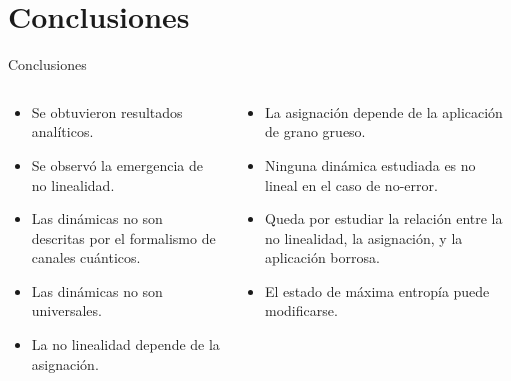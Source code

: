 \section{Conclusiones}

\begin{frame}{Conclusiones}
    \begin{columns}
        \begin{column}{0.5\textwidth}
            \begin{itemize}
                \item Se obtuvieron resultados analíticos.\pause
                \item Se observó la emergencia de no linealidad.\pause
                \item Las dinámicas no son descritas por el formalismo de canales cuánticos.\pause
                \item Las dinámicas no son universales.\pause
                \item La no linealidad depende de la asignación.\pause
            \end{itemize}
        \end{column}
        \begin{column}{0.5\textwidth}
            \begin{itemize}
                \item La asignación depende de la aplicación de grano grueso.\pause
                \item Ninguna dinámica estudiada es no lineal en el caso de no-error.\pause
                \item Queda por estudiar la relación entre la no linealidad, la asignación, y la aplicación borrosa.\pause
                \item El estado de máxima entropía puede modificarse.\pause
            \end{itemize}
        \end{column}
    \end{columns}
\end{frame}
